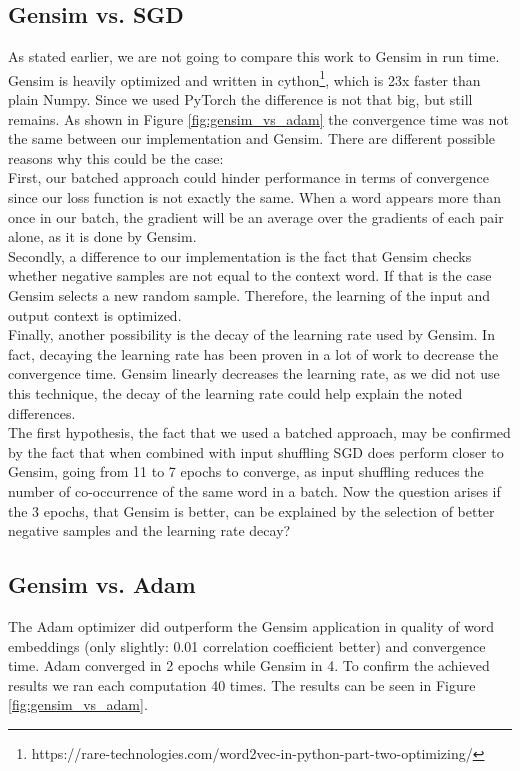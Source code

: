 \subsection{Gensim vs. SGD}
As stated earlier, we are not going to compare this work to Gensim in run time. Gensim is heavily optimized and written in cython\footnote{https://rare-technologies.com/word2vec-in-python-part-two-optimizing/}, which is 23x faster than plain Numpy. Since we used PyTorch the difference is not that big, but still remains. As shown in Figure \ref{fig:gensim_vs_adam} the convergence time was not the same between our implementation and Gensim. There are different possible reasons why this could be the case:\\ First, our batched approach could hinder performance in terms of convergence since our loss function is not exactly the same. When a word appears more than once in our batch, the gradient will be an average over the gradients of each pair alone, as it is done by Gensim.\\ Secondly, a difference to our implementation is the fact that Gensim checks whether negative samples are not equal to the context word. If that is the case Gensim selects a new random sample. Therefore, the learning of the input and output context is optimized. \\Finally, another possibility is the decay of the learning rate used by Gensim. In fact, decaying the learning rate has been proven in a lot of work to decrease the convergence time. Gensim linearly decreases the learning rate, as we did not use this technique, the decay of the learning rate could help explain the noted differences. \\ The first hypothesis, the fact that we used a batched approach, may be confirmed by the fact that when combined with input shuffling SGD does perform closer to Gensim, going from 11 to 7 epochs to converge, as input shuffling reduces the number of co-occurrence of the same word in a batch.
Now the question arises if the 3 epochs, that Gensim is better, can be explained by the selection of better negative samples and the learning rate decay?

\subsection{Gensim vs. Adam}
The Adam optimizer did outperform the Gensim application in quality of word embeddings (only slightly: 0.01 correlation coefficient better) and convergence time. Adam converged in 2 epochs while Gensim in 4. To confirm the achieved results we ran each computation 40 times. The results can be seen in Figure \ref{fig:gensim_vs_adam}.

